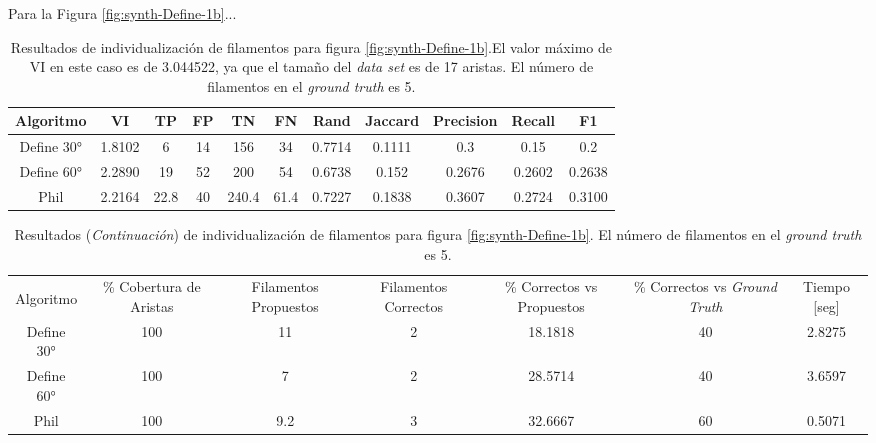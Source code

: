 Para la Figura \ref{fig:synth-Define-1b}...


\begin{table}[h]
    \centering
    \begin{tabular}{|c|c|c|c|c|c|c|c|c|c|c|}
    \hline
        Algoritmo & VI & TP & FP &TN &FN & Rand	& Jaccard &	Precision &	Recall &	F1 \\ \hline
        Define 30° & 1.8102 & 6 & 14 & 156  & 34 & 0.7714 & 0.1111  & 0.3 & 0.15 & 0.2\\
        Define 60° & 2.2890 & 19 & 52 & 200 & 54 & 0.6738 & 0.152 & 0.2676  & 0.2602  & 0.2638\\ 
        Phil & 2.2164 & 22.8 & 40 & 240.4 & 61.4 & 0.7227 & 0.1838 & 0.3607 & 0.2724 & 0.3100\\
        \hline
    \end{tabular}
    \caption{Resultados de individualizaci\'on de filamentos para figura \ref{fig:synth-Define-1b}.El valor m\'aximo de VI en este caso es de 3.044522, ya que el tama\~no del {\it data set} es de 17 aristas. El n\'umero de filamentos en el {\it ground truth} es 5.}
    \label{tab:synth-Define-1b}
\end{table}
\addtocounter{table}{-1}
\begin{table}[h]
    \centering
    \begin{tabular}{|c|c|c|c|c|c|c|}
    \hline
         & \multirow{4}{2cm}{\centering \% Cobertura de Aristas} & \multirow{4}{2cm}{Filamentos Propuestos} & \multirow{4}{2cm}{Filamentos Correctos} & \multirow{4}{2.5cm}{\% Correctos vs Propuestos} & \multirow{4}{2.5cm}{\centering \% Correctos vs {\it Ground Truth}} & \multirow{4}{1.2cm}{\centering Tiempo [seg]} \\
         &  &  &  & & &  \\
        Algoritmo &  &  &  & & &  \\
        &  &  &  & & &  \\ \hline
        Define 30° & 100 & 11 & 2 & 18.1818 & 40 & 2.8275\\
        Define 60° & 100 & 7 & 2 & 28.5714 & 40 & 3.6597\\ 
        Phil & 100 & 9.2 & 3 & 32.6667 & 60 & 0.5071\\
        \hline
    \end{tabular}
    \caption{Resultados ({\it Continuaci\'on}) de individualizaci\'on de filamentos para figura \ref{fig:synth-Define-1b}. El n\'umero de filamentos en el {\it ground truth} es 5.}
\end{table}

